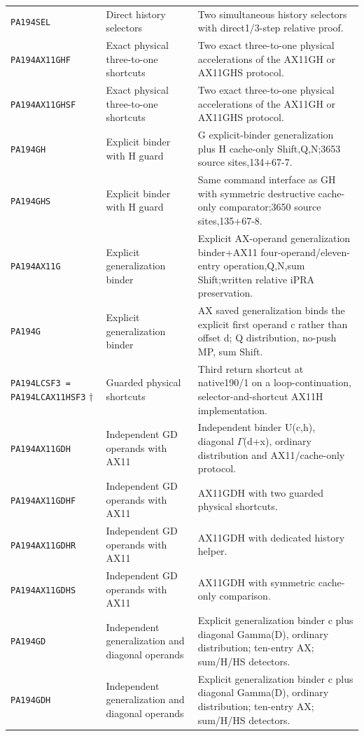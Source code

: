 \begin{longtable}{@{}>{\raggedright\arraybackslash}p{}>{\raggedright\arraybackslash}p{}>{\raggedright\arraybackslash}p{}@{}}
\nolinkurl{PA194SEL} & Direct history selectors & Two simultaneous history selectors with direct1/3-step relative proof.\\
\nolinkurl{PA194AX11GHF} & Exact physical three-to-one shortcuts & Two exact three-to-one physical accelerations of the AX11GH or AX11GHS protocol.\\
\nolinkurl{PA194AX11GHSF} & Exact physical three-to-one shortcuts & Two exact three-to-one physical accelerations of the AX11GH or AX11GHS protocol.\\
\nolinkurl{PA194GH} & Explicit binder with H guard & G explicit-binder generalization plus H cache-only Shift,Q,N;3653 source sites,134+67-7.\\
\nolinkurl{PA194GHS} & Explicit binder with H guard & Same command interface as GH with symmetric destructive cache-only comparator;3650 source sites,135+67-8.\\
\nolinkurl{PA194AX11G} & Explicit generalization binder & Explicit AX-operand generalization binder+AX11 four-operand/eleven-entry operation,Q,N,sum Shift;written relative iPRA preservation.\\
\nolinkurl{PA194G} & Explicit generalization binder & AX saved generalization binds the explicit first operand c rather than offset d; Q distribution, no-push MP, sum Shift.\\
\nolinkurl{PA194LCSF3 = PA194LCAX11HSF3} $\dagger$ & Guarded physical shortcuts & Third return shortcut at native190/1 on a loop-continuation, selector-and-shortcut AX11H implementation.\\
\nolinkurl{PA194AX11GDH} & Independent GD operands with AX11 & Independent binder U(c,h), diagonal $\Gamma$(d+x), ordinary distribution and AX11/cache-only protocol.\\
\nolinkurl{PA194AX11GDHF} & Independent GD operands with AX11 & AX11GDH with two guarded physical shortcuts.\\
\nolinkurl{PA194AX11GDHR} & Independent GD operands with AX11 & AX11GDH with dedicated history helper.\\
\nolinkurl{PA194AX11GDHS} & Independent GD operands with AX11 & AX11GDH with symmetric cache-only comparison.\\
\nolinkurl{PA194GD} & Independent generalization and diagonal operands & Explicit generalization binder c plus diagonal Gamma(D), ordinary distribution; ten-entry AX; sum/H/HS detectors.\\
\nolinkurl{PA194GDH} & Independent generalization and diagonal operands & Explicit generalization binder c plus diagonal Gamma(D), ordinary distribution; ten-entry AX; sum/H/HS detectors.\\

\end{longtable}

